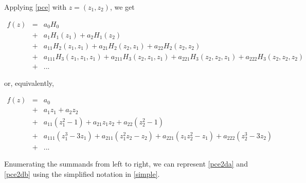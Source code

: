 \documentclass[11pt]{article}
\numberwithin{equation}{section}
\begin{document}
\begin{appendix}
Applying \eqref{pce} with  $z = (z_1, z_2)$, we get 

\begin{eqnarray}
f(z) & = & a_0 H_0 \nonumber \\
& + & a_1 H_1(z_1) + a_2 H_1(z_2) \nonumber \\
& + & a_{11} H_2(z_1, z_1) + a_{21} H_2(z_2, z_1) + a_{22} H_2(z_2, z_2) \nonumber \\
& + & a_{111} H_3(z_1, z_1, z_1) + a_{211} H_3(z_2, z_1, z_1) + a_{221} H_3(z_2, z_2, z_1) + a_{222} H_3(z_2, z_2, z_2) \nonumber \\
& + & ... \label{pce2da}
\end{eqnarray}

or, equivalently,

\begin{eqnarray}
f(z) & = & a_0 \nonumber \\
& + & a_1 z_1 + a_2 z_2 \nonumber \\
& + & a_{11} (z_1^2 - 1) + a_{21} z_1 z_2 + a_{22} (z_2^2 - 1) \nonumber \\
& + & a_{111} (z_1^3 - 3 z_1) + a_{211} (z_1^2 z_2 - z_2) + a_{221} (z_1 z_2^2 - z_1) + a_{222} (z_2^3 - 3 z_2) \nonumber \\
& + & ... \label{pce2db}
\end{eqnarray}

Enumerating the summands from left to right, we can represent \eqref{pce2da} and \eqref{pce2db} using the simplified notation in \eqref{simple}.

\end{appendix}
\end{document}

